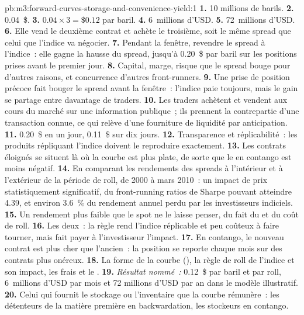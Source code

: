 \begin{solution}{pb:m3:forward-curves-storage-and-convenience-yield:1}
\textbf{1.} 10 millions de barils. \textbf{2.} 0.04~\$. \textbf{3.} $0.04 \times 3 = \$0.12$ par baril.
\textbf{4.} 6~millions d'USD. \textbf{5.} 72~millions d'USD. \textbf{6.} Elle vend le deuxième contrat et achète
le troisième, soit le même spread que celui que l'indice va négocier. \textbf{7.} Pendant la fenêtre, revendre le spread
à l'indice~: elle gagne la hausse du spread, jusqu'à 0.20~\$ par baril sur les positions prises avant le premier jour.
\textbf{8.} Capital, marge, risque que le spread bouge pour d'autres raisons, et concurrence d'autres
front-runners. \textbf{9.} Une prise de position précoce fait bouger le spread avant la fenêtre~: l'indice paie toujours,
mais le gain se partage entre davantage de traders. \textbf{10.} Les traders achètent et vendent aux cours du marché sur
une information publique~; ils prennent la contrepartie d'une transaction connue, ce qui relève d'une fourniture de liquidité par anticipation.
\textbf{11.} 0.20~\$ en un jour, 0.11~\$ sur dix jours. \textbf{12.} Transparence et réplicabilité~: les produits
répliquant l'indice doivent le reproduire exactement. \textbf{13.} Les contrats éloignés se situent là où la courbe est
plus plate, de sorte que le  en contango est moins négatif. \textbf{14.} En comparant les rendements des spreads à l'intérieur
et à l'extérieur de la période de roll, de 2000 à mars 2010~: un impact de prix statistiquement significatif, du front-running
ratios de Sharpe pouvant atteindre 4.39, et environ 3.6~\% du rendement annuel perdu par les investisseurs indiciels. \textbf{15.} Un
rendement plus faible que le spot ne le laisse penser, du fait du  et du coût de roll. \textbf{16.} Les deux~: la règle rend
l'indice réplicable et peu coûteux à faire tourner, mais fait payer à l'investisseur l'impact. \textbf{17.} En contango, le nouveau
contrat est plus cher que l'ancien~: la position se reporte chaque mois sur des contrats plus onéreux.
\textbf{18.} La forme de la courbe (), la règle de roll de l'indice et son impact, les frais et le
. \textbf{19.} \emph{Résultat nommé~:} 0.12~\$ par baril et par roll, 6~millions d'USD par mois et 72
millions d'USD par an dans le modèle illustratif. \textbf{20.} Celui qui fournit le stockage ou l'inventaire que
la courbe rémunère~: les détenteurs de la matière première en backwardation, les stockeurs en contango.
\end{solution}

